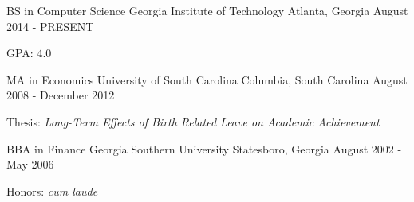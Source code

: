 

\begin{cventries}

  \cventry
    {BS in Computer Science} %
    {Georgia Institute of Technology} %
    {Atlanta, Georgia} %
    {August 2014 - PRESENT} %
    {
      \begin{cvitems} %
        \item {GPA: 4.0}
      \end{cvitems}
    }
    
    \cventry
    {MA in Economics} %
    {University of South Carolina} %
    {Columbia, South Carolina} %
    {August 2008 - December 2012} %
    {
      \begin{cvitems} %
        \item {Thesis: \textit{Long-Term Effects of Birth Related Leave on Academic Achievement}}
      \end{cvitems}
    }
    
    \cventry
    {BBA in Finance} %
    {Georgia Southern University} %
    {Statesboro, Georgia} %
    {August 2002 - May 2006} %
    {
      \begin{cvitems} %
        \item {Honors: \textit{cum laude}}
      \end{cvitems}
    }

\end{cventries}
